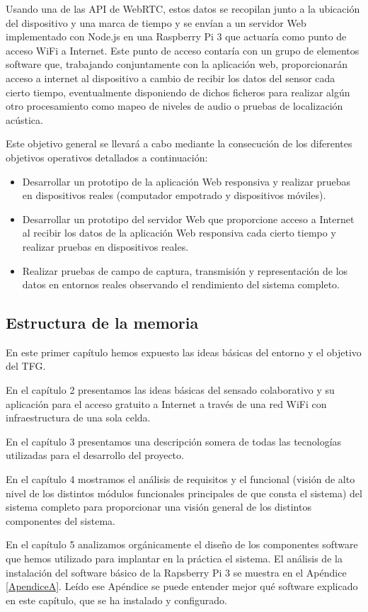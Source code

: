 Usando una de las API de WebRTC, estos datos se recopilan junto a la ubicación del dispositivo y una marca de tiempo y se envían a un servidor Web implementado con Node.js en una Raspberry Pi 3 que actuaría como punto de acceso WiFi a Internet. Este punto de acceso contaría con un grupo de elementos software que, trabajando conjuntamente con la aplicación web, proporcionarán acceso a internet al dispositivo a cambio de recibir los datos del sensor cada cierto tiempo, eventualmente disponiendo de dichos ficheros para realizar algún otro procesamiento como mapeo de niveles de audio o pruebas de localización acústica.

Este objetivo general se llevará a cabo mediante la consecución de los diferentes objetivos operativos detallados a continuación:
\begin{itemize}
\item Desarrollar un prototipo de la aplicación Web responsiva y realizar pruebas en dispositivos reales (computador empotrado y dispositivos móviles).
\item Desarrollar un prototipo del servidor Web que proporcione acceso a Internet al recibir los datos de la aplicación Web responsiva cada cierto tiempo y realizar pruebas en dispositivos reales.
\item Realizar pruebas de campo de captura, transmisión y representación de los datos en entornos reales observando el rendimiento del sistema completo.
\end{itemize}

\subsection{Estructura de la memoria}
En este primer capítulo hemos expuesto las ideas básicas del entorno y el objetivo del TFG.

En el capítulo 2 presentamos las ideas básicas del sensado colaborativo y su aplicación para el acceso gratuito a Internet a través de una red WiFi con infraestructura de una sola celda.

En el capítulo 3 presentamos una descripción somera de todas las tecnologías utilizadas para el desarrollo del proyecto.

En el capítulo 4 mostramos el análisis de requisitos y el funcional (visión de alto nivel de los distintos módulos funcionales principales de que consta el sistema) del sistema completo para proporcionar una visión general de los distintos componentes del sistema.

En el capítulo 5 analizamos orgánicamente el diseño de los componentes software que hemos utilizado para implantar en la práctica el sistema. El análisis de la instalación del software básico de la Rapsberry Pi 3 se muestra en el Apéndice \ref{ApendiceA}. Leído ese Apéndice se puede entender mejor qué software explicado en este capítulo, que se ha instalado y configurado.

